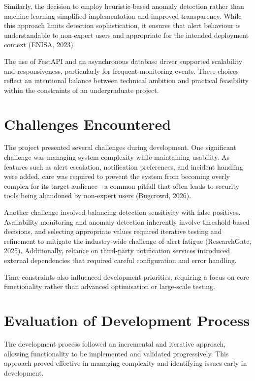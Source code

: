Similarly, the decision to employ heuristic-based anomaly detection rather than machine learning simplified implementation and improved transparency. While this approach limits detection sophistication, it ensures that alert behaviour is understandable to non-expert users and appropriate for the intended deployment context (ENISA, 2023).

The use of FastAPI and an asynchronous database driver supported scalability and responsiveness, particularly for frequent monitoring events. These choices reflect an intentional balance between technical ambition and practical feasibility within the constraints of an undergraduate project.

\section{Challenges Encountered}

The project presented several challenges during development. One significant challenge was managing system complexity while maintaining usability. As features such as alert escalation, notification preferences, and incident handling were added, care was required to prevent the system from becoming overly complex for its target audience---a common pitfall that often leads to security tools being abandoned by non-expert users (Bugcrowd, 2026).

Another challenge involved balancing detection sensitivity with false positives. Availability monitoring and anomaly detection inherently involve threshold-based decisions, and selecting appropriate values required iterative testing and refinement to mitigate the industry-wide challenge of alert fatigue (ResearchGate, 2025). Additionally, reliance on third-party notification services introduced external dependencies that required careful configuration and error handling.

Time constraints also influenced development priorities, requiring a focus on core functionality rather than advanced optimisation or large-scale testing.

\section{Evaluation of Development Process}

The development process followed an incremental and iterative approach, allowing functionality to be implemented and validated progressively. This approach proved effective in managing complexity and identifying issues early in development.

